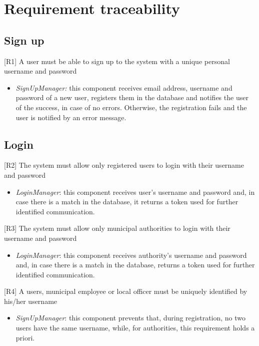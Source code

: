 	\chapter{Requirement traceability}
		\section{Sign up}
				{[R1]} A user must be able to sign up to the system with a unique personal username and password
					\begin{itemize}
						\item \textit{SignUpManager:} this component receives email address, username and password of a new user, registers them in the database and notifies the user of the success, in case of no errors. Otherwise, the registration fails and the user is notified by an error message.
					\end{itemize}
		\section{Login}
			{[R2]} The system must allow only registered users to login with their username and password
					\begin{itemize}
						\item \textit{LoginManager}: this component receives user's username and password and, in case there is a match in the database, it  returns a token used for further identified communication.
					\end{itemize}
			{[R3]} The system must allow only municipal authorities to login with their username and password
					\begin{itemize}
						\item \textit{LoginManager}: this component receives authority's username and password and, in case there is a match in the database, returns a token used for further identified communication.  
					\end{itemize}
			{[R4]} A users, municipal employee or local officer must be uniquely identified by his/her username
					\begin{itemize}
						\item \textit{SignUpManager}: this component prevents that, during registration, no two users have the same username, while, for authorities, this requirement holds a priori.
					\end{itemize}
				

